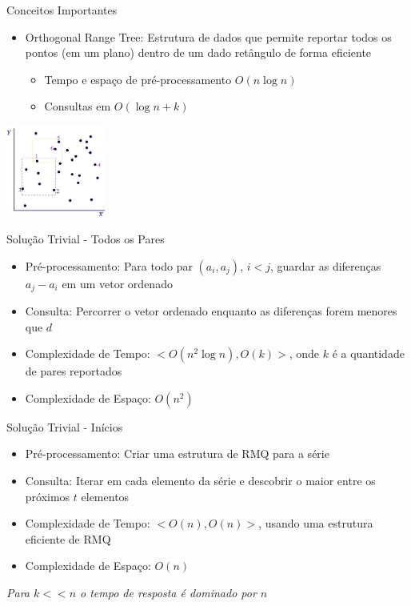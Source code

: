 \documentclass{beamer}
\begin{document}
\begin{frame}{Conceitos Importantes}
\begin{itemize}
\item
Orthogonal Range Tree: Estrutura de dados que permite
reportar todos os pontos (em um plano) dentro de um 
dado retângulo de forma eficiente
\begin{itemize}
\item Tempo e espaço de pré-processamento $O(n \log n)$
\item Consultas em $O(\log n + k)$
\end{itemize}
\end{itemize}
\begin{center}
\includegraphics[height=3.0cm]{range_search.jpg}
\end{center}

\end{frame}

\begin{frame}{Solução Trivial - Todos os Pares}
\begin{itemize}
\item
Pré-processamento: Para todo par $(a_i, a_j)$, $i<j$, guardar as 
diferenças $a_j - a_i$ em um vetor ordenado
\item 
Consulta: Percorrer o vetor ordenado enquanto as diferenças
forem menores que $d$
\item
Complexidade de Tempo:
$<O(n^2 \log n), O(k)>$, onde $k$ é a quantidade de pares reportados
\item
Complexidade de Espaço: $O(n^2)$
\end{itemize}
\end{frame}

\begin{frame}{Solução Trivial - Inícios}
\begin{itemize}
\item
Pré-processamento: Criar uma estrutura de RMQ para a série
\item 
Consulta: Iterar em cada elemento da série e descobrir o maior
entre os próximos $t$ elementos
\item 
Complexidade de Tempo:
$<O(n), O(n)>$, usando uma estrutura eficiente de RMQ
\item
Complexidade de Espaço:
$O(n)$
\end{itemize}
\textit{Para $k << n$ o tempo de resposta é dominado por $n$}
\end{frame}
\end{document}
